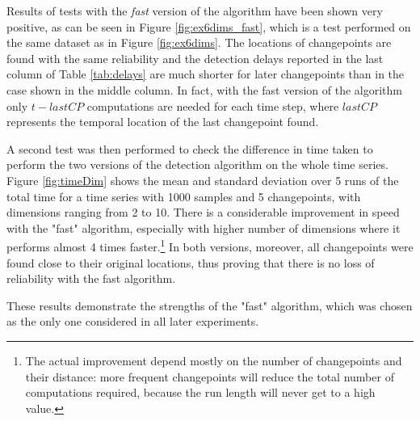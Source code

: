 \documentclass[11pt,twoside,a4paper]{report}
\begin{document}
Results of tests with the \textit{fast} version of the algorithm have been shown very positive, as can be seen in Figure \ref{fig:ex6dims_fast}, which is a test performed on the same dataset as in Figure \ref{fig:ex6dims}. The locations of changepoints are found with the same reliability and the detection delays reported in the last column of Table \ref{tab:delays} are much shorter for later changepoints than in the case shown in the middle column. In fact, with the fast version of the algorithm only $t-lastCP$ computations are needed for each time step, where $lastCP$ represents the temporal location of the last changepoint found.


A second test was then performed to check the difference in time taken to perform the two versions of the detection algorithm on the whole time series. Figure \ref{fig:timeDim} shows the mean and standard deviation over 5 runs of the total time for a time series with 1000 samples and 5 changepoints, with dimensions ranging from 2 to 10. There is a considerable improvement in speed with the "fast" algorithm, especially with higher number of dimensions where it performs almost 4 times faster.\footnote{The actual improvement depend mostly on the number of changepoints and their distance: more frequent changepoints will reduce the total number of computations required, because the run length will never get to a high value.} In both versions, moreover, all changepoints were found close to their original locations, thus proving that there is no loss of reliability with the fast algorithm.

These results demonstrate the strengths of the "fast" algorithm, which was chosen as the only one considered in all later experiments.
\end{document}
